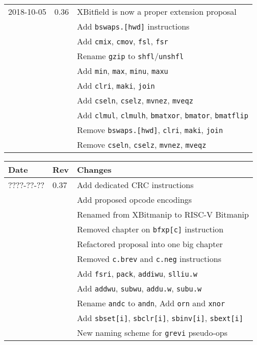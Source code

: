 \documentclass[twoside,11pt]{book}
\begin{document}
\begin{center}
\begin{tabular}{lll}
2018-10-05 & 0.36 & XBitfield is now a proper extension proposal \\
           &      & Add {\tt bswaps.[hwd]} instructions \\
           &      & Add {\tt cmix}, {\tt cmov}, {\tt fsl}, {\tt fsr} \\
           &      & Rename {\tt gzip} to {\tt shfl}/{\tt unshfl} \\
           &      & Add {\tt min}, {\tt max}, {\tt minu}, {\tt maxu} \\
           &      & Add {\tt clri}, {\tt maki}, {\tt join} \\
           &      & Add {\tt cseln}, {\tt cselz}, {\tt mvnez}, {\tt mveqz} \\
           &      & Add {\tt clmul}, {\tt clmulh}, {\tt bmatxor}, {\tt bmator}, {\tt bmatflip} \\
           &      & Remove {\tt bswaps.[hwd]}, {\tt clri}, {\tt maki}, {\tt join} \\
           &      & Remove {\tt cseln}, {\tt cselz}, {\tt mvnez}, {\tt mveqz}
\end{tabular}
\end{center}

\begin{center}
\begin{tabular}{lll}
Date & Rev & Changes \\
\hline
????-??-?? & 0.37 & Add dedicated CRC instructions \\
           &      & Add proposed opcode encodings \\
           &      & Renamed from XBitmanip to RISC-V Bitmanip \\
           &      & Removed chapter on {\tt bfxp[c]} instruction \\
           &      & Refactored proposal into one big chapter \\
           &      & Removed {\tt c.brev} and {\tt c.neg} instructions \\
           &      & Add {\tt fsri}, {\tt pack}, {\tt addiwu}, {\tt slliu.w} \\
           &      & Add {\tt addwu}, {\tt subwu}, {\tt addu.w}, {\tt subu.w} \\
           &      & Rename {\tt andc} to {\tt andn}, Add {\tt orn} and {\tt xnor} \\
           &      & Add {\tt sbset[i]}, {\tt sbclr[i]}, {\tt sbinv[i]}, {\tt sbext[i]} \\
           &      & New naming scheme for {\tt grevi} pseudo-ops
\end{tabular}
\end{center}



\end{document}
